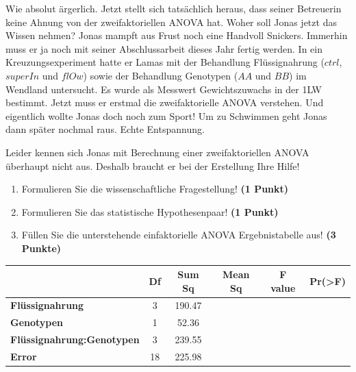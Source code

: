 \documentclass[a4paper, 9pt]{scrartcl}\usepackage[]{graphicx}\usepackage[]{xcolor}
\begin{document}
Wie absolut ärgerlich. Jetzt stellt sich tatsächlich heraus, dass seiner Betreuerin keine Ahnung von der zweifaktoriellen ANOVA hat. Woher soll Jonas jetzt das Wissen nehmen? Jonas mampft aus Frust noch eine Handvoll Snickers. Immerhin muss er ja noch mit seiner Abschlussarbeit dieses Jahr fertig werden. In ein Kreuzungsexperiment hatte er Lamas mit der Behandlung Flüssignahrung ($ctrl$, $superIn$ und $flOw$) sowie der Behandlung Genotypen ($AA$ und $BB$) im Wendland untersucht. Es wurde als Messwert Gewichtszuwachs in der 1LW bestimmt. Jetzt muss er erstmal die zweifaktorielle ANOVA verstehen. Und eigentlich wollte Jonas doch noch zum Sport! Um zu Schwimmen geht Jonas dann später nochmal raus. Echte Entspannung.



\vspace{1ex}

Leider kennen sich Jonas mit Berechnung einer zweifaktoriellen ANOVA überhaupt nicht aus. Deshalb braucht er bei der Erstellung Ihre Hilfe! 

\begin{enumerate}
  \item Formulieren Sie die wissenschaftliche Fragestellung! \textbf{(1 Punkt)}
  \item Formulieren Sie das statistische Hypothesenpaar! \textbf{(1 Punkt)}
\item Füllen Sie die unterstehende einfaktorielle ANOVA Ergebnistabelle aus! \textbf{(3 Punkte)}
\end{enumerate}

\vspace{1Ex}

\begin{center}
  \Large
  \begin{tabular}{lccccc}
  \toprule
     & \textbf{Df} & \textbf{Sum Sq} & \textbf{Mean Sq} & \textbf{F value} & \textbf{Pr(>F)} \strut\\
    \midrule
   \textbf{Flüssignahrung}  & 3 & 190.47 &  &  &  \strut\\
    \textbf{Genotypen}  & 1 & 52.36 &  &  &  \strut\\
    \textbf{Flüssignahrung:Genotypen}  & 3 & 239.55 &  &  &  \strut\\
   \textbf{Error}  & 18 & 225.98 &  &  &  \strut\\
\bottomrule
  \end{tabular}
\end{center}

\vspace{1Ex}
\end{document}
